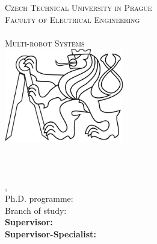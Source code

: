 
\begin{titlepage}
  \begin{center}

    \textsc{\Large Czech Technical University in Prague}\\[1em]
    \textsc{\large Faculty of Electrical Engineering\\
    \Department\\
    Multi-robot Systems\\[3em]
    }
    \includegraphics[height=4.1cm]{fig/ctu_lion.pdf}\\[3em]

    \textbf{\textsc{\Huge \Title}}\\[2em]

    \textbf{\Large \DocName}\\[6em]

    \textbf{\huge \Author}\\[6em]

    {\large \Location, \Date}\\[3em]

    Ph.D. programme: \Programme\\
    Branch of study: \Field\\[2em]

    \textbf{Supervisor: \Supervisor}\\
    \textbf{Supervisor-Specialist: \SupervisorSpecialist}

    \vspace{2pt}

  \end{center}
\end{titlepage}
